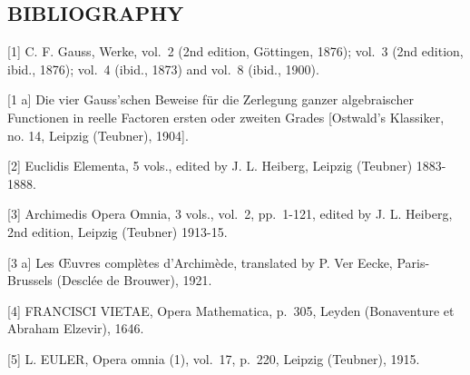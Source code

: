 \subsection*{BIBLIOGRAPHY}

{[}1{]} C. F. Gauss, Werke, vol.~2 (2nd edition, Göttingen, 1876); vol.~3 (2nd edition, ibid., 1876); vol.~4 (ibid., 1873) and vol.~8 (ibid., 1900).

{[}1 a{]} Die vier Gauss'schen Beweise für die Zerlegung ganzer algebraischer Functionen in reelle Factoren ersten oder zweiten Grades {[}Ostwald's Klassiker, no. 14, Leipzig (Teubner), 1904{]}.

{[}2{]} Euclidis Elementa, 5 vols., edited by J. L. Heiberg, Leipzig (Teubner) 1883-1888.

{[}3{]} Archimedis Opera Omnia, 3 vols., vol.~2, pp.~1-121, edited by J. L. Heiberg, 2nd edition, Leipzig (Teubner) 1913-15.

{[}3 a{]} Les Œuvres complètes d'Archimède, translated by P. Ver Eecke, Paris-Brussels (Desclée de Brouwer), 1921.

{[}4{]} FRANCISCI VIETAE, Opera Mathematica, p.~305, Leyden (Bonaventure et Abraham Elzevir), 1646.

{[}5{]} L. EULER, Opera omnia (1), vol.~17, p.~220, Leipzig (Teubner), 1915.

